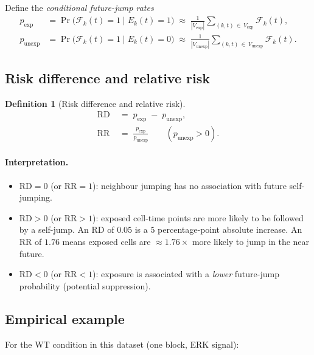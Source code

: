 \documentclass[11pt,a4paper]{article}
\theoremstyle{definition}
\newtheorem{definition}{Definition}[section]
\theoremstyle{plain}
\newcommand{\FJ}[2]{\mathcal{F}_{#1}(#2)}
\newcommand{\expo}[2]{E_{#1}(#2)}
\newcommand{\RD}{\mathrm{RD}}
\newcommand{\RR}{\mathrm{RR}}
\newcommand{\pE}{p_{\mathrm{exp}}}
\newcommand{\pU}{p_{\mathrm{unexp}}}
\newcommand{\1}[1]{\mathbf{1}\!\left[#1\right]}
\begin{document}
Define the \emph{conditional future-jump rates}
\begin{align}
  \pE &= \Pr\!\bigl(\FJ{k}{t}=1 \;\big|\; \expo{k}{t}=1\bigr)
       \;\approx\; \frac{1}{|V_{\mathrm{exp}}|}
         \sum_{(k,t)\,\in\, V_{\mathrm{exp}}} \FJ{k}{t},
       \label{eq:pE}\\[6pt]
  \pU &= \Pr\!\bigl(\FJ{k}{t}=1 \;\big|\; \expo{k}{t}=0\bigr)
       \;\approx\; \frac{1}{|V_{\mathrm{unexp}}|}
         \sum_{(k,t)\,\in\, V_{\mathrm{unexp}}} \FJ{k}{t}.
       \label{eq:pU}
\end{align}

\subsection{Risk difference and relative risk}

\begin{definition}[Risk difference and relative risk]\label{def:RD-RR}
\begin{align}
  \RD &\;=\; \pE \;-\; \pU, \label{eq:RD}\\[4pt]
  \RR &\;=\; \frac{\pE}{\pU} \qquad (\pU > 0). \label{eq:RR}
\end{align}
\end{definition}

\paragraph{Interpretation.}
\begin{itemize}
  \item $\RD = 0$ (or $\RR = 1$): neighbour jumping has no association
        with future self-jumping.
  \item $\RD > 0$ (or $\RR > 1$): exposed cell-time points are more likely
        to be followed by a self-jump.
        An $\RD$ of $0.05$ is a $5$ percentage-point absolute increase.
        An $\RR$ of $1.76$ means exposed cells are $\approx 1.76\times$ more
        likely to jump in the near future.
  \item $\RD < 0$ (or $\RR < 1$): exposure is associated with a
        \emph{lower} future-jump probability (potential suppression).
\end{itemize}

\subsection{Empirical example}

For the WT condition in this dataset (one block, ERK signal):
\end{document}
